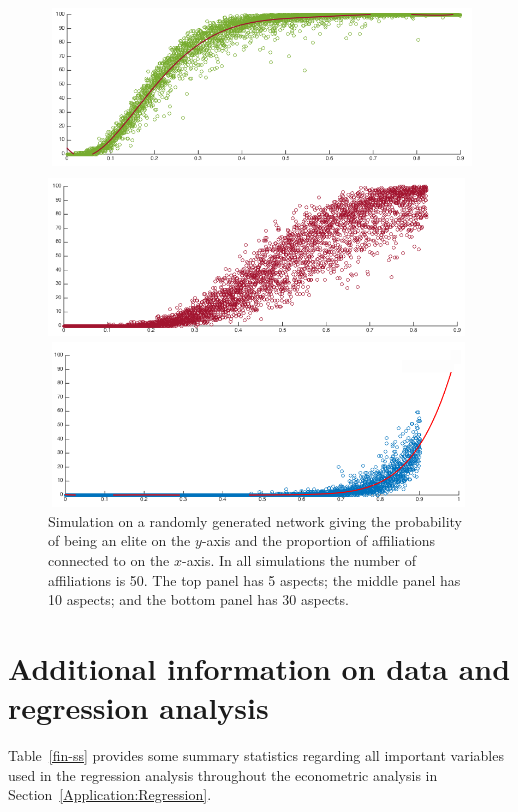 \begin{subappendices}
\begin{figure}[h!]
\begin{center}
\includegraphics[scale=0.5]{imgs/RandSim1.png}
\end{center}
\caption[Probability distribution of a random node being an elite]{Simulation on a randomly generated network giving the probability of being an elite on the $y$-axis and the proportion of affiliations connected to on the $x$-axis. In all simulations the number of affiliations is 50. The top panel has 5 aspects; the middle panel has 10 aspects; and the bottom panel has 30 aspects.}
\label{RandSim1}
\end{figure}

\section[Additional information on data and regression analysis]{Additional information on data and regression analysis} \label{AppB}

Table~\ref{fin-ss} provides some summary statistics regarding all important variables used in the regression analysis throughout the econometric analysis in Section~\ref{Application:Regression}.


\end{subappendices}
